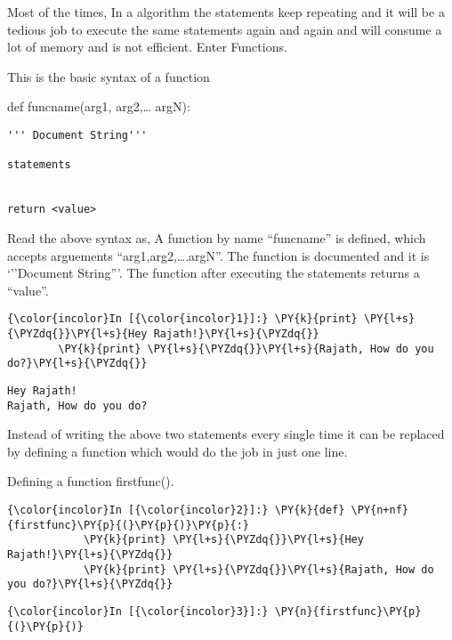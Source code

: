     Most of the times, In a algorithm the statements keep repeating and it
will be a tedious job to execute the same statements again and again and
will consume a lot of memory and is not efficient. Enter Functions.

    This is the basic syntax of a function

    def funcname(arg1, arg2,\ldots{} argN):

\begin{verbatim}
''' Document String'''

statements


return <value>
\end{verbatim}

    Read the above syntax as, A function by name ``funcname'' is defined,
which accepts arguements ``arg1,arg2,\ldots{}.argN''. The function is
documented and it is `''Document String'''. The function after executing
the statements returns a ``value''.

    \begin{Verbatim}[commandchars=\\\{\}]
{\color{incolor}In [{\color{incolor}1}]:} \PY{k}{print} \PY{l+s}{\PYZdq{}}\PY{l+s}{Hey Rajath!}\PY{l+s}{\PYZdq{}}
        \PY{k}{print} \PY{l+s}{\PYZdq{}}\PY{l+s}{Rajath, How do you do?}\PY{l+s}{\PYZdq{}}
\end{Verbatim}

    \begin{Verbatim}[commandchars=\\\{\}]
Hey Rajath!
Rajath, How do you do?
    \end{Verbatim}

    Instead of writing the above two statements every single time it can be
replaced by defining a function which would do the job in just one line.

Defining a function firstfunc().

    \begin{Verbatim}[commandchars=\\\{\}]
{\color{incolor}In [{\color{incolor}2}]:} \PY{k}{def} \PY{n+nf}{firstfunc}\PY{p}{(}\PY{p}{)}\PY{p}{:}
            \PY{k}{print} \PY{l+s}{\PYZdq{}}\PY{l+s}{Hey Rajath!}\PY{l+s}{\PYZdq{}}
            \PY{k}{print} \PY{l+s}{\PYZdq{}}\PY{l+s}{Rajath, How do you do?}\PY{l+s}{\PYZdq{}}   
\end{Verbatim}

    \begin{Verbatim}[commandchars=\\\{\}]
{\color{incolor}In [{\color{incolor}3}]:} \PY{n}{firstfunc}\PY{p}{(}\PY{p}{)}
\end{Verbatim}

